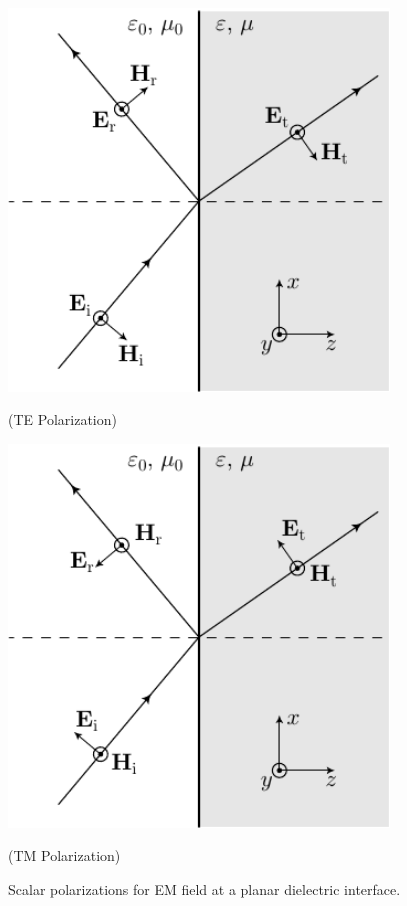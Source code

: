 \begin{figure}
  \begin{minipage}{0.5\linewidth}
  \centering

  \includegraphics[width=0.9\textwidth]{fig/analytical/kvectorTE}

  (TE Polarization)
\end{minipage}
\begin{minipage}{0.5\linewidth}
  \centering

  \includegraphics[width=0.9\textwidth]{fig/analytical/kvectorTM}

  (TM Polarization)
\end{minipage}
\caption[Scalar polarizations at planar interface]{Scalar polarizations for EM field at a planar 
    dielectric interface.}
  \label{fig:planar}
\end{figure}

